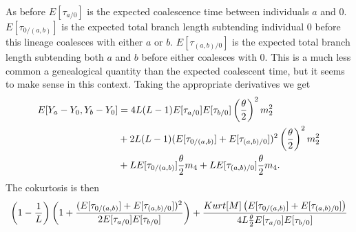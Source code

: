 As before $E[\tau_{a/0}]$ is the expected coalescence time between individuals
$a$ and $0$. $E[\tau_{0/(a,b)}]$ is the expected total branch length subtending
individual $0$ before this lineage coalesces with either $a$ or $b$.
$E[\tau_{(a,b)/0}]$ is the expected total branch length subtending both $a$ and
$b$ before either coalesces with $0$. This is a much less common a genealogical
quantity than the expected coalescent time, but it seems to make sense in this
context. Taking the appropriate derivatives we get
\begin{align}
  E[Y_a-Y_0,Y_b-Y_0] &= 4L(L-1)E[\tau_{a/0}]E[\tau_{b/0}]\left(\frac{\theta}{2}\right)^2m_2^2 \nonumber \\
                     &+ 2L(L-1)(E[\tau_{0/(a,b)}]+E[\tau_{(a,b)/0}])^2\left( \frac{\theta}{2} \right)^2 m_2^2 \nonumber \\
                     &+ L E[\tau_{0/(a,b)}] \frac{\theta}{2} m_4 + L E[\tau_{(a,b)/0}] \frac{\theta}{2} m_4.
\end{align}
The cokurtosis is then 
\begin{equation}
  \left( 1 - \frac{1}{L} \right) \left( 1 + 
  \frac{(E[\tau_{0/(a,b)}]+E[\tau_{(a,b)/0}])^2}{2E[\tau_{a/0}]E[\tau_{b/0}]} \right)+ 
  \frac{Kurt[M]\left(E[\tau_{0/(a,b)}] +  E[\tau_{(a,b)/0}]\right)}{4L \frac{\theta}{2} E[\tau_{a/0}]E[\tau_{b/0}]}
\end{equation}
